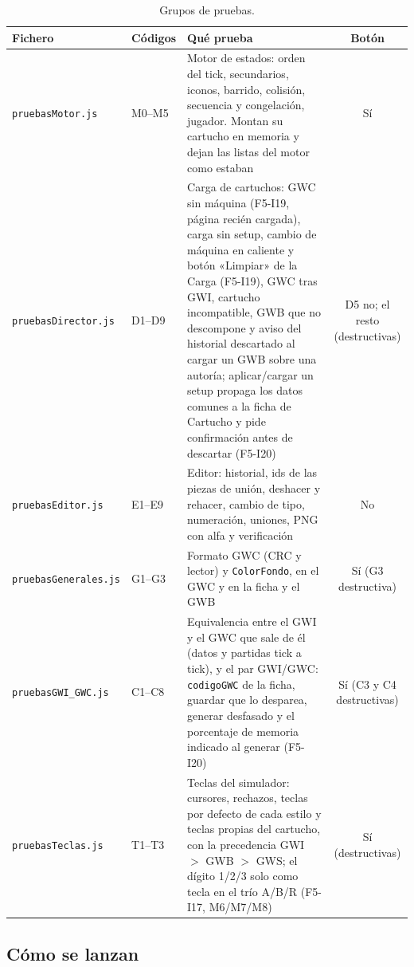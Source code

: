 \begin{table}[H]
	\centering
	\begin{tabularx}{\textwidth}{l l >{\RaggedRight\arraybackslash}X c}
		\toprule
		\textbf{Fichero} & \textbf{Códigos} & \textbf{Qué prueba} & \textbf{Botón} \\
		\midrule
		\texttt{pruebasMotor.js} & M0--M5 & Motor de estados: orden del tick, secundarios, iconos, barrido, colisión, secuencia y congelación, jugador. Montan su cartucho en memoria y dejan las listas del motor como estaban & Sí \\
		\texttt{pruebasDirector.js} & D1--D9 & Carga de cartuchos: GWC sin máquina (F5-I19, página recién cargada), carga sin setup, cambio de máquina en caliente y botón «Limpiar» de la Carga (F5-I19), GWC tras GWI, cartucho incompatible, GWB que no descompone y aviso del historial descartado al cargar un GWB sobre una autoría; aplicar/cargar un setup propaga los datos comunes a la ficha de Cartucho y pide confirmación antes de descartar (F5-I20) & D5 no; el resto (destructivas) \\
		\texttt{pruebasEditor.js} & E1--E9 & Editor: historial, ids de las piezas de unión, deshacer y rehacer, cambio de tipo, numeración, uniones, PNG con alfa y verificación & No \\
		\texttt{pruebasGenerales.js} & G1--G3 & Formato GWC (CRC y lector) y \texttt{ColorFondo}, en el GWC y en la ficha y el GWB & Sí (G3 destructiva) \\
		\texttt{pruebasGWI\_GWC.js} & C1--C8 & Equivalencia entre el GWI y el GWC que sale de él (datos y partidas tick a tick), y el par GWI/GWC: \texttt{codigoGWC} de la ficha, guardar que lo desparea, generar desfasado y el porcentaje de memoria indicado al generar (F5-I20) & Sí (C3 y C4 destructivas) \\
		\texttt{pruebasTeclas.js} & T1--T3 & Teclas del simulador: cursores, rechazos, teclas por defecto de cada estilo y teclas propias del cartucho, con la precedencia GWI $>$ GWB $>$ GWS; el dígito 1/2/3 solo como tecla en el trío A/B/R (F5-I17, M6/M7/M8) & Sí (destructivas) \\
		\bottomrule
	\end{tabularx}
	\caption{Grupos de pruebas.}
\end{table}

\subsection{Cómo se lanzan}
\label{sec:F5I18Lanzar}

